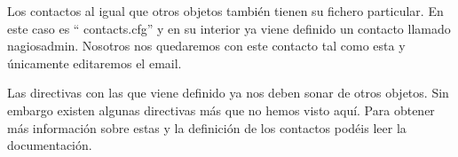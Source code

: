 \documentclass[12pt]{book}
\begin{document}
    Los contactos al igual que otros objetos también tienen su fichero particular. En este caso es “ contacts.cfg” y
    en su interior ya viene definido un contacto llamado nagiosadmin. Nosotros nos quedaremos con este
    contacto tal como esta y únicamente editaremos el email.
    \vspace{-5mm}
    \begin{alltt}
      
    \end{alltt}
    \vspace{-5mm}
    Las directivas con las que viene definido ya nos deben sonar de otros objetos. Sin embargo existen algunas
    directivas más que no hemos visto aquí. Para obtener más información sobre estas y la definición de los
    contactos podéis leer la documentación.

      
\end{document}
